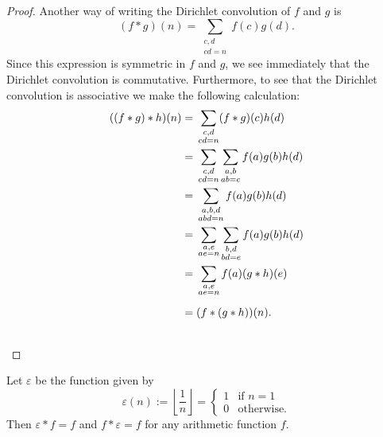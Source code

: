 \begin{proof}
  Another way of writing the Dirichlet convolution of $f$ and $g$ is
  \begin{equation*}
    (f\ast g)(n) = \sum_{\substack{c,d\\ cd=n}}f(c)g(d).
  \end{equation*}
  Since this expression is symmetric in $f$ and $g$, we see immediately that the Dirichlet convolution is commutative.
  Furthermore, to see that the Dirichlet convolution is associative we make the following calculation:
  \begin{align*}
    ((f\ast g)\ast h)(n) & = \vphantom{\sum_{\substack{a,b,d\\ abd=n}}}\sum_{\substack{c,d\\ cd=n}}(f\ast g)(c)h(d) \\
                         & = \vphantom{\sum_{\substack{a,b,d\\ abd=n}}}\sum_{\substack{c,d\\ cd=n}}\sum_{\substack{a,b\\ ab=c}}f(a)g(b)h(d) \\
                         & = \vphantom{\sum_{\substack{a,b,d\\ abd=n}}}\sum_{\substack{a,b,d\\ abd=n}}f(a)g(b)h(d) \\
                         & = \vphantom{\sum_{\substack{a,b,d\\ abd=n}}}\sum_{\substack{a,e\\ ae=n}}\sum_{\substack{b,d\\bd=e}}f(a)g(b)h(d) \\
                         & = \vphantom{\sum_{\substack{a,b,d\\ abd=n}}}\sum_{\substack{a,e\\ae=n}}f(a)(g\ast h)(e) \\
                         & = \vphantom{\sum_{\substack{a,b,d\\ abd=n}}}(f\ast (g\ast h))(n).\qedhere
  \end{align*}
\end{proof}

\begin{theorem}
  Let $\varepsilon$ be the function given by
  \begin{equation*}
    \varepsilon(n):=\left\lfloor\frac{1}{n}\right\rfloor=
    \begin{cases}
      1 & \text{if }n=1 \\
      0 & \text{otherwise.}
    \end{cases}
  \end{equation*}
  Then $\varepsilon\ast f=f$ and $f\ast\varepsilon=f$ for any arithmetic function $f$.
\end{theorem}

